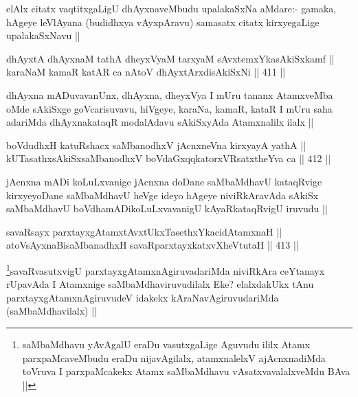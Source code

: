 \begin{artha}
elAlx citatx vaqtitxgaLigU dhAyxnaveMbudu upalakaSxNa aMdare:- gamaka, hAgeye leVlAyana (budidhxya vAyxpAravu) samasatx citatx kirxyegaLige upalakaSxNavu ||
\end{artha}


\begin{shl}
dhAyxtA dhAyxnaM tathA dheyxVyaM tarxyaM sAvxtemxYkasAkiSxkamf || \\
karaNaM kamaR katAR ca nAtoV dhAyxtArxdisAkiSxNi ||  411 ||  
\end{shl}

\begin{artha}
dhAyxna mADuvavanUnx, dhAyxna, dheyxVya I mUru tananx AtamxveMba oMde sAkiSxge goVcarisuvavu, hiVgeye, karaNa, kamaR, kataR I mUru saha adariMda dhAyxnakataqR modalAdavu sAkiSxyAda Atamxnalilx ilalx ||
\end{artha}


\begin{shl}
boVdudhxH katuRshacx saMbanodhxV jAcnxneVna kirxyayA yathA || \\
kUTasathxsAkiSxsaMbanodhxV boVdaGxqqkatorxVRsatxtheYva ca ||  412 || 
\end{shl}

\begin{artha}
jAcnxna mADi koLuLxvanige jAcnxna doDane saMbaMdhavU kataqRvige kirxyeyoDane saMbaMdhavU heVge ideyo hAgeye niviRkAravAda sAkiSx saMbaMdhavU boVdhamADikoLuLxvavanigU kAyaRkataqRvigU iruvudu ||
\end{artha}

\begin{shl}
savaRsayx parxtayxgAtamxtAvxtUkxTasethxYkacidAtamxnaH || \\
atoV\s sAyxnaBisaMbanadhxH savaRparxtayxkatxvXheVtutaH ||  413 ||  
\end{shl}

\begin{artha}
\footnote{saMbaMdhavu yAvAgalU eraDu vasutxgaLige Aguvudu ililx Atamx parxpaMcaveMbudu eraDu nijavAgilalx, atamxnalelxV ajAcnxnadiMda toVruva I parxpaMcakekx Atamx saMbaMdhavu vAsatxvavalalxveMdu BAva ||}savaRvasutxvigU parxtayxgAtamxnAgiruvadariMda niviRkAra ceYtanayx rUpavAda I Atamxnige saMbaMdhaviruvudilalx Eke? elalxdakUkx tAnu parxtayxgAtamxnAgiruvudeV idakekx kAraNavAgiruvudariMda (saMbaMdhavilalx) ||
\end{artha}

